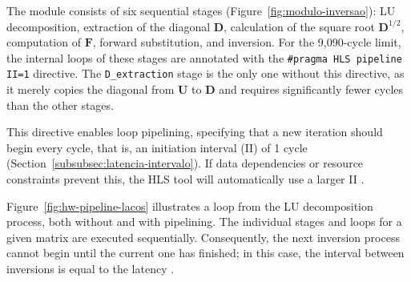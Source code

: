 The module consists of six sequential stages (Figure~\ref{fig:modulo-inversao}): LU decomposition, extraction of the diagonal $\mathbf D$, calculation of the square root $\mathbf D^{1/2}$, computation of $\mathbf F$, forward substitution, and inversion. For the 9,090-cycle limit, the internal loops of these stages are annotated with the \texttt{\#pragma HLS pipeline II=1} directive. The \texttt{D\_extraction} stage is the only one without this directive, as it merely copies the diagonal from $\mathbf U$ to $\mathbf D$ and requires significantly fewer cycles than the other stages.

This directive enables loop pipelining, specifying that a new iteration should begin every cycle, that is, an initiation interval (II) of 1 cycle (Section~\ref{subsubsec:latencia-intervalo}). If data dependencies or resource constraints prevent this, the HLS tool will automatically use a larger II \cite[p.~45]{kastner-hls}.

Figure~\ref{fig:hw-pipeline-lacos} illustrates a loop from the LU decomposition process, both without and with pipelining. The individual stages and loops for a given matrix are executed sequentially. Consequently, the next inversion process cannot begin until the current one has finished; in this case, the interval between inversions is equal to the latency \cite[p.~114]{kastner-hls}.

